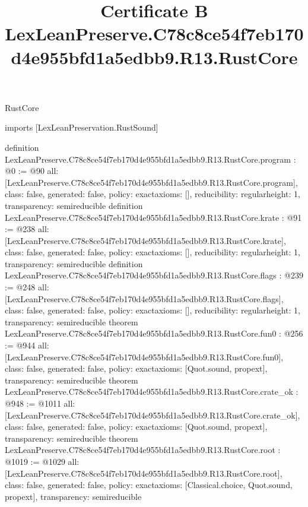 \begin{lexlean}{RustCore}
\title{Certificate B LexLeanPreserve.C78c8ce54f7eb170d4e955bfd1a5edbb9.R13.RustCore}
\begin{coremodule}
imports [LexLeanPreservation.RustSound]

definition LexLeanPreserve.C78c8ce54f7eb170d4e955bfd1a5edbb9.R13.RustCore.program : @0 := @90 {
  all: [LexLeanPreserve.C78c8ce54f7eb170d4e955bfd1a5edbb9.R13.RustCore.program],
  class: false,
  generated: false,
  policy: exact{axioms: []},
  reducibility: regular{height: 1},
  transparency: semireducible
}
definition LexLeanPreserve.C78c8ce54f7eb170d4e955bfd1a5edbb9.R13.RustCore.krate : @91 := @238 {
  all: [LexLeanPreserve.C78c8ce54f7eb170d4e955bfd1a5edbb9.R13.RustCore.krate],
  class: false,
  generated: false,
  policy: exact{axioms: []},
  reducibility: regular{height: 1},
  transparency: semireducible
}
definition LexLeanPreserve.C78c8ce54f7eb170d4e955bfd1a5edbb9.R13.RustCore.flags : @239 := @248 {
  all: [LexLeanPreserve.C78c8ce54f7eb170d4e955bfd1a5edbb9.R13.RustCore.flags],
  class: false,
  generated: false,
  policy: exact{axioms: []},
  reducibility: regular{height: 1},
  transparency: semireducible
}
theorem LexLeanPreserve.C78c8ce54f7eb170d4e955bfd1a5edbb9.R13.RustCore.fun0 : @256 := @944 {
  all: [LexLeanPreserve.C78c8ce54f7eb170d4e955bfd1a5edbb9.R13.RustCore.fun0],
  class: false,
  generated: false,
  policy: exact{axioms: [Quot.sound, propext]},
  transparency: semireducible
}
theorem LexLeanPreserve.C78c8ce54f7eb170d4e955bfd1a5edbb9.R13.RustCore.crate_ok : @948 := @1011 {
  all: [LexLeanPreserve.C78c8ce54f7eb170d4e955bfd1a5edbb9.R13.RustCore.crate_ok],
  class: false,
  generated: false,
  policy: exact{axioms: [Quot.sound, propext]},
  transparency: semireducible
}
theorem LexLeanPreserve.C78c8ce54f7eb170d4e955bfd1a5edbb9.R13.RustCore.root : @1019 := @1029 {
  all: [LexLeanPreserve.C78c8ce54f7eb170d4e955bfd1a5edbb9.R13.RustCore.root],
  class: false,
  generated: false,
  policy: exact{axioms: [Classical.choice, Quot.sound, propext]},
  transparency: semireducible
}


\end{coremodule}
\end{lexlean}
